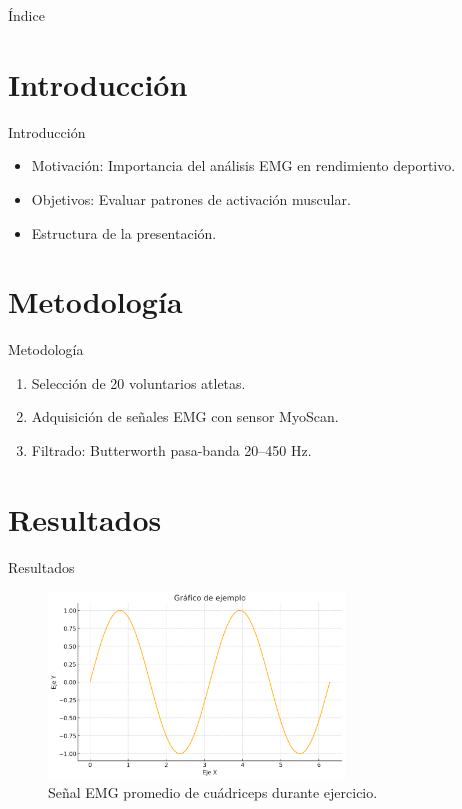 \documentclass[12pt]{beamer}
\title[\acronimoTrabajo]{\tituloTrabajo}
\subtitle{\cursoNombre}
\author[\cursoNombre]{\autorA \\\autorB\\ \autorC}
\institute[]{\carrera\\Docente: \docente}
\date{\fechaEntrega}
\begin{document}
\begin{frame}[plain]
    \titlepage
\end{frame}

\begin{frame}{Índice}
    \tableofcontents
\end{frame}

\section{Introducción}
\begin{frame}{Introducción}
    \begin{itemize}
        \item Motivación: Importancia del análisis EMG en rendimiento deportivo.
        \item Objetivos: Evaluar patrones de activación muscular.
        \item Estructura de la presentación.
    \end{itemize}
\end{frame}

\section{Metodología}
\begin{frame}{Metodología}
    \begin{enumerate}
        \item Selección de 20 voluntarios atletas.
        \item Adquisición de señales EMG con sensor MyoScan.
        \item Filtrado: Butterworth pasa-banda 20–450 Hz.
    \end{enumerate}
\end{frame}

\section{Resultados}
\begin{frame}{Resultados}
    \begin{figure}
        \centering
        \includegraphics[width=0.7\textwidth]{ejemplo_grafico.png}
        \caption{Señal EMG promedio de cuádriceps durante ejercicio.}
    \end{figure}
\end{frame}
\end{document}
